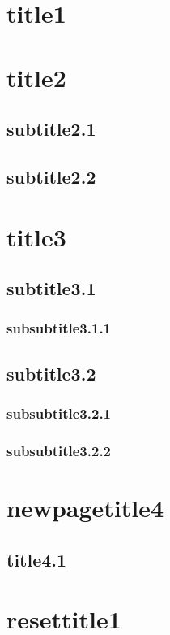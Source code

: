 \documentclass[a4paper,dvipdfmx]{jsarticle}
\begin{document}
\pagestyle{foot}

\section{title1}


\section{title2}
	\subsection{subtitle2.1}


	\subsection{subtitle2.2}


\section{title3}
	\subsection{subtitle3.1}
		\subsubsection{subsubtitle3.1.1}


	\subsection{subtitle3.2}
		\subsubsection{subsubtitle3.2.1}


		\subsubsection{subsubtitle3.2.2}

\newpage
\pagestyle{foot}
\addtocounter{page}{3}

\section{newpagetitle4}
	\subsection{title4.1}

\setcounter{section}{0}
\section{resettitle1}
\end{document}
